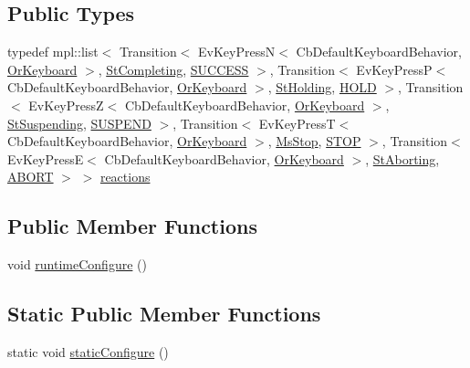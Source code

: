 \subsection*{Public Types}
\begin{DoxyCompactItemize}
\item 
typedef mpl\+::list$<$ Transition$<$ Ev\+Key\+PressN$<$ Cb\+Default\+Keyboard\+Behavior, \hyperlink{classsm__packml_1_1OrKeyboard}{Or\+Keyboard} $>$, \hyperlink{structsm__packml_1_1StCompleting}{St\+Completing}, \hyperlink{classSUCCESS}{S\+U\+C\+C\+E\+SS} $>$, Transition$<$ Ev\+Key\+PressP$<$ Cb\+Default\+Keyboard\+Behavior, \hyperlink{classsm__packml_1_1OrKeyboard}{Or\+Keyboard} $>$, \hyperlink{structsm__packml_1_1StHolding}{St\+Holding}, \hyperlink{structsm__packml_1_1StExecute_1_1HOLD}{H\+O\+LD} $>$, Transition$<$ Ev\+Key\+PressZ$<$ Cb\+Default\+Keyboard\+Behavior, \hyperlink{classsm__packml_1_1OrKeyboard}{Or\+Keyboard} $>$, \hyperlink{structsm__packml_1_1StSuspending}{St\+Suspending}, \hyperlink{structsm__packml_1_1StExecute_1_1SUSPEND}{S\+U\+S\+P\+E\+ND} $>$, Transition$<$ Ev\+Key\+PressT$<$ Cb\+Default\+Keyboard\+Behavior, \hyperlink{classsm__packml_1_1OrKeyboard}{Or\+Keyboard} $>$, \hyperlink{classsm__packml_1_1MsStop}{Ms\+Stop}, \hyperlink{structsm__packml_1_1StExecute_1_1STOP}{S\+T\+OP} $>$, Transition$<$ Ev\+Key\+PressE$<$ Cb\+Default\+Keyboard\+Behavior, \hyperlink{classsm__packml_1_1OrKeyboard}{Or\+Keyboard} $>$, \hyperlink{structsm__packml_1_1StAborting}{St\+Aborting}, \hyperlink{classABORT}{A\+B\+O\+RT} $>$ $>$ \hyperlink{structsm__packml_1_1StExecute_af118309910aebee1f998960eb0fad7a0}{reactions}
\end{DoxyCompactItemize}
\subsection*{Public Member Functions}
\begin{DoxyCompactItemize}
\item 
void \hyperlink{structsm__packml_1_1StExecute_a6653ce8b5d8ffb94d146a804d5413b15}{runtime\+Configure} ()
\end{DoxyCompactItemize}
\subsection*{Static Public Member Functions}
\begin{DoxyCompactItemize}
\item 
static void \hyperlink{structsm__packml_1_1StExecute_ac4500ddafb5c02a0958cc5641ea2c80e}{static\+Configure} ()
\end{DoxyCompactItemize}
